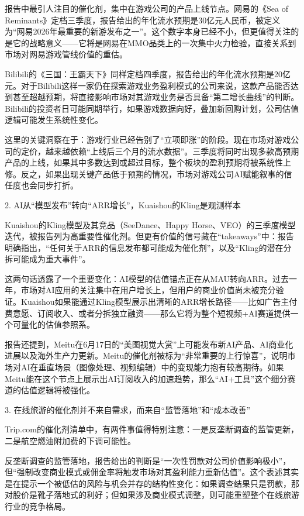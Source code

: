 \documentclass[11pt]{ctexart}
\begin{document}
报告中最引人注目的催化剂，集中在游戏公司的产品上线节点。网易的《Sea of Reminants》定档三季度，报告给出的年化流水预期是30亿元人民币，被定义为“网易2026年最重要的新游发布之一”。这个数字本身已经不小，但更值得关注的是它的战略意义——它将是网易在MMO品类上的一次集中火力检验，直接关系到市场对网易游戏管线价值的重估。

Bilibili的《三国：王霸天下》同样定档四季度，报告给出的年化流水预期是20亿元。对于Bilibili这样一家仍在探索游戏业务盈利模式的公司来说，这款产品能否达到甚至超越预期，将直接影响市场对其游戏业务是否具备“第二增长曲线”的判断。Bilibili的投资者日可能同期举行，如果游戏数据向好，叠加新回购计划，公司估值逻辑可能发生系统性变化。

这里的关键洞察在于：游戏行业已经告别了“立项即涨”的阶段。现在市场对游戏公司的定价，越来越依赖“上线后三个月的流水数据”。三季度将同时出现多款高预期产品的上线，如果其中多数达到或超过目标，整个板块的盈利预期将被系统性上修。反之，如果出现关键产品低于预期的情况，市场对游戏公司AI赋能叙事的信任度也会同步打折。

2. AI从“模型发布”转向“ARR增长”，Kuaishou的Kling是观测样本

Kuaishou的Kling模型及其竞品（SeeDance、Happy Horse、VEO）的三季度模型迭代，被报告列为高重要性催化剂。但更有价值的信号藏在“takeaways”中：报告明确指出，“任何关于ARR的信息发布都可能成为催化剂”，以及“Kling的潜在分拆可能成为重大事件”。

这两句话透露了一个重要变化：AI模型的估值锚点正在从MAU转向ARR。过去一年，市场对AI应用的关注集中在用户增长上，但用户的商业价值尚未被充分验证。Kuaishou如果能通过Kling模型展示出清晰的ARR增长路径——比如广告主付费意愿、订阅收入、或者分拆独立融资——那么它将为整个短视频+AI赛道提供一个可量化的估值参照系。

报告还提到，Meitu在6月17日的“美图视觉大赏”上可能发布新AI产品、AI商业化进展以及海外生产力更新。Meitu的催化剂被标为“非常重要的上行惊喜”，说明市场对AI在垂直场景（图像处理、视频编辑）中的变现能力抱有较高期待。如果Meitu能在这个节点上展示出AI订阅收入的加速趋势，那么“AI+工具”这个细分赛道的估值逻辑将被强化。

3. 在线旅游的催化剂并不来自需求，而来自“监管落地”和“成本改善”

Trip.com的催化剂清单中，有两件事值得特别注意：一是反垄断调查的监管更新，二是航空燃油附加费的下调可能性。

反垄断调查的监管落地，报告给出的判断是“一次性罚款对公司价值影响极小”，但“强制改变商业模式或佣金率将触发市场对其盈利能力重新估值”。这个表述其实是在提示一个被低估的风险与机会并存的结构性变化：如果调查结果只是罚款，那对股价是靴子落地式的利好；但如果涉及商业模式调整，则可能重塑整个在线旅游行业的竞争格局。
\end{document}

